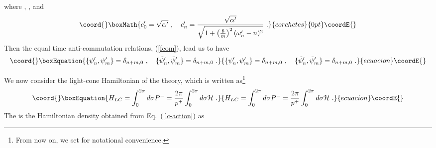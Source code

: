 \documentclass[a4paper,12pt]{article}
\numberwithin{equation}{section}
\begin{document}
where \coordHE{}, \coordHE{}, and
\[\coord{}\boxMath{
c'_0 = \sqrt{\alpha'}~,~~~
c'_n = \frac{\sqrt{\alpha'}}{\sqrt{1 +
          \left( \frac{6}{m} \right)^2 (\omega'_n - n)^2 } }~.
}{corchetes}{0pt}\coordE{}\]
Then the equal time anti-commutation relations, (\ref{fcom}), lead us
to have
\begin{equation}\coord{}\boxEquation{
\{ \psi'_n , \psi'_m \} = \delta_{n+m,0} ~,~~~
\{ \tilde{\psi}'_n, \tilde{\psi}'_m \} = \delta_{n+m,0}~.
\label{fpmcom}
}{
\{ \psi'_n , \psi'_m \} = \delta_{n+m,0} ~,~~~
\{ \tilde{\psi}'_n, \tilde{\psi}'_m \} = \delta_{n+m,0}~.
}{ecuacion}\coordE{}\end{equation}

We now consider the light-cone Hamiltonian of the theory, which is
written as\footnote{ From now on, we set \coordHE{} for notational convenience.}
\begin{equation}\coord{}\boxEquation{
H_{LC}
 = \int^{2\pi}_0 d \sigma P^-
 = \frac{2 \pi}{p^+} \int^{2\pi}_0 d \sigma {\cal H} ~.
\label{lc-ham}
}{
H_{LC}
 = \int^{2\pi}_0 d \sigma P^-
 = \frac{2 \pi}{p^+} \int^{2\pi}_0 d \sigma {\cal H} ~.
}{ecuacion}\coordE{}\end{equation}
The \coordHE{} is the Hamiltonian density obtained from
Eq.~(\ref{lc-action}) as
\end{document}
